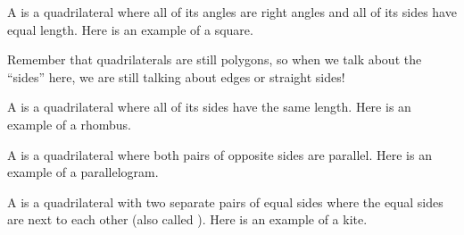 \documentclass{ximera}
\begin{document}
\begin{definition}
	A  is a quadrilateral where all of its angles are right angles and all of its sides have equal length. Here is an example of a square.
	\begin{image}
	\end{image}
\end{definition}
Remember that quadrilaterals are still polygons, so when we talk about the ``sides'' here, we are still talking about edges or straight sides!

\begin{definition}
	A  is a quadrilateral where all of its sides have the same length. Here is an example of a rhombus.
	\begin{image}
	\end{image}
\end{definition}


\begin{definition}
	A  is a quadrilateral where both pairs of opposite sides are parallel. Here is an example of a parallelogram.
	\begin{image}
	\end{image}
\end{definition}


\begin{definition}
	A  is a quadrilateral with two separate pairs of equal sides where the equal sides are next to each other (also called ). Here is an example of a kite.
	\begin{image}
	\end{image}
\end{definition}
\end{document}
